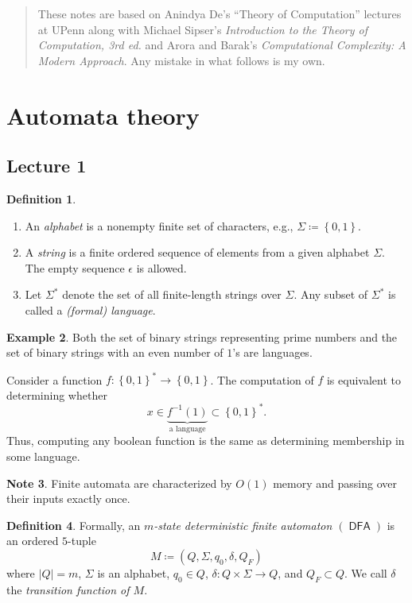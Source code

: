 \documentclass[10pt,letterpaper,cm]{nupset}
\theoremstyle{definition}
\newtheorem{definition}{Definition}[subsection]
\newtheorem{exmp}[definition]{Example}
\newtheorem{note}[definition]{Note}
\theoremstyle{theorem}
\theoremstyle{remark}
\newcommand{\1}{\mathbf{1}}
\newcommand{\0}{\vec 0}
\DeclareMathOperator{\DFA}{\mathsf{DFA}}
\begin{document}
\thispagestyle{empty}
\begin{abstract}
These notes are based on Anindya De's ``Theory of Computation'' lectures at UPenn along with Michael Sipser's \textit{Introduction to the Theory of Computation, 3rd ed.} and Arora and Barak's \textit{Computational Complexity: A Modern Approach}. Any mistake in what follows is my own.
\end{abstract}

\tableofcontents
\newpage

\section{Automata theory}

\subsection{Lecture 1}

\begin{definition} $ $
\begin{enumerate}
\item An \textit{alphabet} is a nonempty finite set of characters, e.g., $\Sigma \coloneqq \left\{0,1\right\}$. 
\item A \textit{string} is a finite ordered sequence of elements from a given alphabet $\Sigma$. The empty sequence $\epsilon$ is allowed.
\item Let $\Sigma^{\ast}$ denote the set of all finite-length strings over $\Sigma$. Any subset of $\Sigma^{\ast}$ is called a \textit{(formal) language}.
\end{enumerate}
\end{definition}

\begin{exmp}
Both the set of binary strings representing prime numbers and the set of binary strings with an even number of $1$'s are languages. 
\end{exmp}

\smallskip

Consider a function $f: \left\{0,1\right\}^{\ast} \to \left\{0,1\right\}$. The computation of $f$ is equivalent to determining whether $$x\in \underbrace{f^{-1}(1)}_{\text{a language}} \subset \left\{0,1\right\}^{\ast}.$$ Thus, computing any boolean function is the same as determining membership in some language.


\begin{note}
Finite automata are characterized by $O(1)$ memory and passing over their inputs exactly once.
\end{note}
\begin{definition}
Formally, an \textit{$m$-state deterministic finite automaton $(\DFA)$}  is an ordered $5$-tuple $$M\coloneqq \left(Q, \Sigma, q_0, \delta, Q_F\right)  $$ where  $|Q| = m$, $\Sigma$ is an alphabet, $q_0\in Q$, $\delta : Q\times \Sigma \to Q$, and $Q_F\subset Q$. We call $\delta$ the \textit{transition function of $M$}.
\end{definition}
\end{document}
